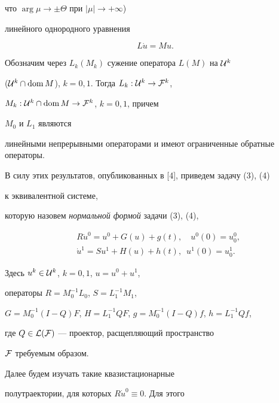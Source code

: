 что $\arg \mu \to \pm \Theta$ при $|\mu |\to+\infty$)


линейного однородного уравнения


\begin{equation}


L \Dot u=Mu.


\end{equation}


Обозначим через $L_k (M_k)$ сужение оператора $L(M)$ на ${\cal U}^k$


(${\cal U}^k \cap \operatorname{dom} M$), $k=0,1$. Тогда $L_k: {\cal U}^k \to {\cal F}^k$,


$M_k:{\cal U}^k \cap \operatorname{dom} M\to {\cal F}^k$, $k=0,1$, причем


$M_0$ и $L_1$ являются


линейными непрерывными операторами и имеют ограниченные обратные операторы.





В силу этих результатов, опубликованных в [4], приведем задачу (3), (4)


к эквивалентной системе,


которую назовем {\it нормальной формой} задачи (3), (4),


\begin{equation}


\begin{split}


&R \Dot u^0 =u^0+G(u)+g(t), \quad u^0(0)=u_0^0,\\


&\Dot u^1=Su^1+H(u)+h(t),\ \; u^1(0)=u_0^1.


\end{split}


\end{equation}


Здесь $u^k \in {\cal U}^k$, $k=0,1$, $u=u^0+u^1$,


операторы $R=M_0^{-1}L_0$, $S=L_1^{-1}M_1$,


$G=M_0^{-1}(I-Q)F$, $H=L_1^{-1}QF$, $g=M_0^{-1}(I-Q)f$, $h=L_1^{-1}Qf$,


где $Q \in {\cal{L}}({\cal F})$ --- проектор, расщепляющий пространство


${\cal F}$ требуемым образом.





Далее будем изучать такие квазистационарные


полутраектории, для которых $R \Dot u^0 \equiv 0$. Для этого


